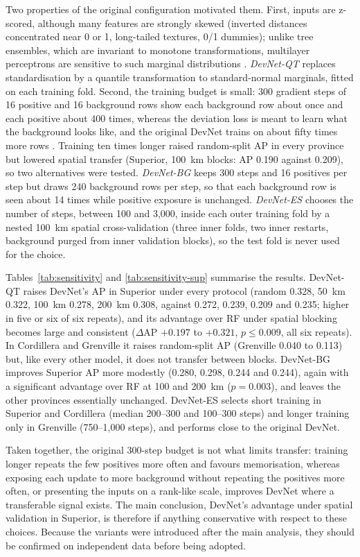 \documentclass[pdflatex,sn-apa]{sn-jnl}
\begin{document}
\begin{appendices}
Two properties of the original configuration motivated them. First, inputs are z-scored, although many features are strongly skewed (inverted distances concentrated near 0 or 1, long-tailed textures, 0/1 dummies); unlike tree ensembles, which are invariant to monotone transformations, multilayer perceptrons are sensitive to such marginal distributions \citep{Gorishniy2021,Grinsztajn2022}. \emph{DevNet-QT} replaces standardisation by a quantile transformation to standard-normal marginals, fitted on each training fold. Second, the training budget is small: 300 gradient steps of 16 positive and 16 background rows show each background row about once and each positive about 400 times, whereas the deviation loss is meant to learn what the background looks like, and the original DevNet trains on about fifty times more rows \citep{Pang2019}. Training ten times longer raised random-split AP in every province but lowered spatial transfer (Superior, 100~km blocks: AP 0.190 against 0.209), so two alternatives were tested. \emph{DevNet-BG} keeps 300 steps and 16 positives per step but draws 240 background rows per step, so that each background row is seen about 14 times while positive exposure is unchanged. \emph{DevNet-ES} chooses the number of steps, between 100 and 3,000, inside each outer training fold by a nested 100~km spatial cross-validation (three inner folds, two inner restarts, background purged from inner validation blocks), so the test fold is never used for the choice.

Tables~\ref{tab:sensitivity} and \ref{tab:sensitivity-sup} summarise the results. DevNet-QT raises DevNet's AP in Superior under every protocol (random 0.328, 50~km 0.322, 100~km 0.278, 200~km 0.308, against 0.272, 0.239, 0.209 and 0.235; higher in five or six of six repeats), and its advantage over RF under spatial blocking becomes large and consistent ($\Delta$AP $+0.197$ to $+0.321$, $p \leq 0.009$, all six repeats). In Cordillera and Grenville it raises random-split AP (Grenville 0.040 to 0.113) but, like every other model, it does not transfer between blocks. DevNet-BG improves Superior AP more modestly (0.280, 0.298, 0.244 and 0.244), again with a significant advantage over RF at 100 and 200~km ($p = 0.003$), and leaves the other provinces essentially unchanged. DevNet-ES selects short training in Superior and Cordillera (median 200--300 and 100--300 steps) and longer training only in Grenville (750--1,000 steps), and performs close to the original DevNet.

Taken together, the original 300-step budget is not what limits transfer: training longer repeats the few positives more often and favours memorisation, whereas exposing each update to more background without repeating the positives more often, or presenting the inputs on a rank-like scale, improves DevNet where a transferable signal exists. The main conclusion, DevNet's advantage under spatial validation in Superior, is therefore if anything conservative with respect to these choices. Because the variants were introduced after the main analysis, they should be confirmed on independent data before being adopted.


\end{appendices}
\end{document}
